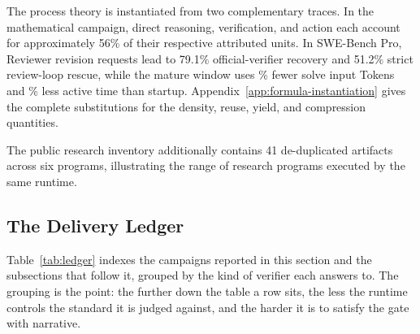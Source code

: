 The process theory is instantiated from two complementary traces. In the
mathematical campaign, direct reasoning, verification, and action each account for
approximately 56\% of their respective attributed units. In SWE-Bench Pro, Reviewer
revision requests lead to 79.1\% official-verifier recovery and 51.2\% strict
review-loop rescue, while the mature window uses \SWEProTokenReduction\% fewer solve input Tokens and
\SWEProTimeReduction\% less active time than startup. Appendix~\ref{app:formula-instantiation} gives
the complete substitutions for the density, reuse, yield, and compression
quantities.

The public research inventory additionally contains 41 de-duplicated artifacts
across six programs, illustrating the range of research programs executed by the
same runtime.

\subsection{The Delivery Ledger}
\label{sec:ledger}

Table~\ref{tab:ledger} indexes the campaigns reported in this section and the
subsections that follow it, grouped by the kind of verifier each answers to. The
grouping is the point: the further down the table a row sits, the less the runtime
controls the standard it is judged against, and the harder it is to satisfy the gate
with narrative.

